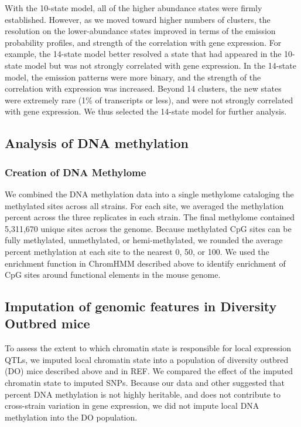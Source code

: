 \documentclass[10pt,letterpaper]{article}
\begin{document}
With the 10-state model, all of the higher abundance states were firmly
established. However, as we moved toward higher numbers of clusters, the
resolution on the lower-abundance states improved in terms of the
emission probability profiles, and strength of the correlation with gene
expression. For example, the 14-state model better resolved a state that
had appeared in the 10-state model but was not strongly correlated with
gene expression. In the 14-state model, the emission patterns were more
binary, and the strength of the correlation with expression was
increased. Beyond 14 clusters, the new states were extremely rare (1\%
of transcripts or less), and were not strongly correlated with gene
expression. We thus selected the 14-state model for further analysis.

\hypertarget{analysis-of-dna-methylation}{%
\subsection{Analysis of DNA
methylation}\label{analysis-of-dna-methylation}}

\hypertarget{creation-of-dna-methylome}{%
\subsubsection{Creation of DNA
Methylome}\label{creation-of-dna-methylome}}

We combined the DNA methylation data into a single methylome cataloging
the methylated sites across all strains. For each site, we averaged the
methylation percent across the three replicates in each strain. The
final methylome contained 5,311,670 unique sites across the genome.
Because methylated CpG sites can be fully methylated, unmethylated, or
hemi-methylated, we rounded the average percent methylation at each site
to the nearest 0, 50, or 100. We used the enrichment function in
ChromHMM described above to identify enrichment of CpG sites around
functional elements in the mouse genome.

\hypertarget{imputation-of-genomic-features-in-diversity-outbred-mice}{%
\subsection{Imputation of genomic features in Diversity Outbred
mice}\label{imputation-of-genomic-features-in-diversity-outbred-mice}}

To assess the extent to which chromatin state is responsible for local
expression QTLs, we imputed local chromatin state into a population of
diversity outbred (DO) mice described above and in REF. We compared the
effect of the imputed chromatin state to imputed SNPs. Because our data
and other suggested that percent DNA methylation is not highly
heritable, and does not contribute to cross-strain variation in gene
expression, we did not impute local DNA methylation into the DO
population.
\end{document}
